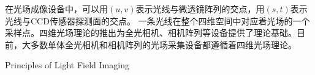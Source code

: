 在光场成像设备中，可以用$(u, v)$表示光线与微透镜阵列的交点，用$(s, t)$表示光线与CCD传感器探测面的交点。
一条光线在整个四维空间中对应着光场的一个采样点。四维光场理论的推出为全光相机、相机阵列等设备提供了理论基础。目前，大多数单体全光相机和相机阵列的光场采集设备都遵循着四维光场理论。
%
%




{Principles of Light Field Imaging}

